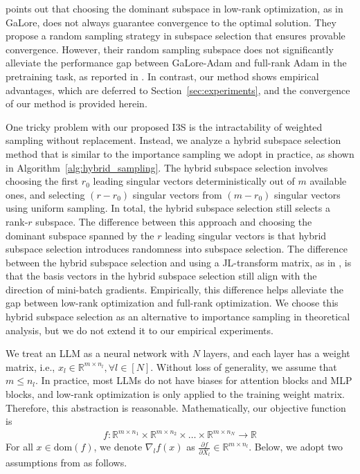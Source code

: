 \cite{he2024subspace} points out that choosing the dominant subspace in low-rank optimization, as in GaLore, does not always guarantee convergence to the optimal solution. They propose a random sampling strategy in subspace selection that ensures provable convergence. However, their random sampling subspace does not significantly alleviate the performance gap between GaLore-Adam and full-rank Adam in the pretraining task, as reported in \cite{he2024subspace}. In contrast, our method shows empirical advantages, which are deferred to Section~\ref{sec:experiments}, and the convergence of our method is provided herein.

One tricky problem with our proposed I3S is the intractability of weighted sampling without replacement. Instead, we analyze a hybrid subspace selection method that is similar to the importance sampling we adopt in practice, as shown in Algorithm~\ref{alg:hybrid_sampling}. The hybrid subspace selection involves choosing the first $r_0$ leading singular vectors deterministically out of $m$ available ones, and selecting $(r-r_0)$ singular vectors from $(m-r_0)$ singular vectors using uniform sampling. In total, the hybrid subspace selection still selects a rank-$r$ subspace. The difference between this approach and choosing the dominant subspace spanned by the $r$ leading singular vectors is that hybrid subspace selection introduces randomness into subspace selection. The difference between the hybrid subspace selection and using a JL-transform matrix, as in \cite{he2024subspace}, is that the basis vectors in the hybrid subspace selection still align with the direction of mini-batch gradients. Empirically, this difference helps alleviate the gap between low-rank optimization and full-rank optimization. We choose this hybrid subspace selection as an alternative to importance sampling in theoretical analysis, but we do not extend it to our empirical experiments.

We treat an LLM as a neural network with $N$ layers, and each layer has a weight matrix, i.e., $x_l\in\mathbb{R}^{m\times n_l}, \forall l \in [N]$. Without loss of generality, we assume that $m \leq n_l$. In practice, most LLMs do not have biases for attention blocks and MLP blocks, and low-rank optimization is only applied to the training weight matrix. Therefore, this abstraction is reasonable. Mathematically, our objective function is 
\begin{align*}
    f: \mathbb{R}^{m \times n_1} \times \mathbb{R}^{m \times n_2} \times \dots \times \mathbb{R}^{m \times n_N} \to \mathbb{R}
\end{align*}
For all $x \in \mathrm{dom}(f)$, we denote $\nabla_l f(x)$ as $\frac{\partial f}{\partial X_l} \in \mathbb{R}^{m \times n_l}$. Below, we adopt two assumptions from \cite{he2024subspace} as follows.

